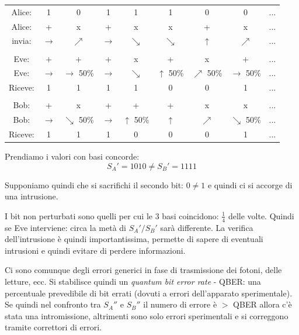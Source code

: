 \begin{table}[ht!]
    \centering
    \begin{tabular}{c|c c c c c c c c}
        Alice: & 1 & 0 & 1 & 1 & 1 & 0 & 0 & ... \\
        Alice: & + & x & + & x & x & + & x & ... \\
        invia: & $\rightarrow$ & $\nearrow$ & $\rightarrow$ & $\searrow$ & $\searrow$ & $\uparrow$ & $\nearrow$ & ... \\
    
        & & & & & & & & \\

        Eve: & + & + & + & x & + & x & + & ... \\
        Eve: & $\rightarrow$ & $\rightarrow$ 50\% & $\rightarrow$ & $\searrow$ & $\uparrow$ 50\% & $\nearrow$ 50\% & $\rightarrow$ 50\% & ... \\
        Riceve: & 1 & 1 & 1 & 1 & 0 & 0 & 1 & ... \\

        & & & & & & & & \\

        Bob: & + & x & + & + & + & x & x & ... \\
        Bob: & $\rightarrow$ & $\searrow$ 50\% & $\rightarrow$ & $\uparrow$ 50\% & $\uparrow$ & $\nearrow$ & $\searrow$ 50\% & ... \\
        Riceve: & 1 & 1 & 1 & 0 & 0 & 0 & 1 & ... \\
    \end{tabular}
\end{table}

Prendiamo i valori con basi concorde:
$$ S_A' = 1010 \neq S_B' = 1111 $$

Supponiamo quindi che si sacrifichi il secondo bit: $0 \neq 1$ e quindi ci si accorge di una intrusione.

I bit non perturbati sono quelli per cui le 3 basi coincidono: $\frac{1}{4}$ delle volte.
Quindi se Eve interviene: circa la metà di $S_A'/S_B'$ sarà differente.
La verifica dell'intrusione è quindi importantissima, permette di sapere di eventuali intrusioni e quindi evitare di perdere informazioni.

Ci sono comunque degli errori generici in fase di trasmissione dei fotoni, delle letture, ecc.
Si stabilisce quindi un \emph{quantum bit error rate} - QBER: una percentuale prevedibile di bit errati (dovuti a errori dell'apparato sperimentale).
Se quindi nel confronto tra $S_A''$ e $S_B''$ il numero di errore è $>$ QBER allora c'è stata una intromissione, altrimenti sono solo errori sperimentali e si correggono tramite correttori di errori.

